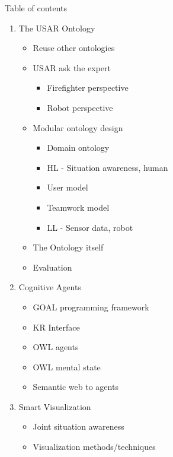 Table of contents
\tableofcontents{}

\begin{enumerate}
\item The USAR Ontology
\begin{itemize}
\item Reuse other ontologies
\item USAR ask the expert 
\begin{itemize}
\item Firefighter perspective
\item Robot perspective
\end{itemize}
\item Modular ontology design
\begin{itemize}
\item Domain ontology
\item HL - Situation awareness, human 
\item User model
\item Teamwork model
\item LL - Sensor data, robot
\end{itemize}
\item The Ontology itself
\item Evaluation
\end{itemize}

\item Cognitive Agents
\begin{itemize}
\item GOAL programming framework
\item KR Interface
\item OWL agents
\item OWL mental state
\item Semantic web to agents
\end{itemize}

\item Smart Visualization
\begin{itemize}
\item Joint situation awareness
\item Visualization methods/techniques
\end{itemize}
\end{enumerate}